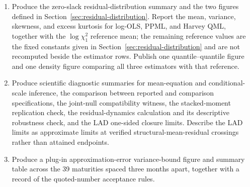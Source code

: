 \documentclass[11pt]{article}
\begin{document}
\begin{enumerate}
In addition to the baseline figures, render sweep figures of fitted conditional standard deviations
for PPML and Harvey QML\@. Solve the coefficient boxes for these figures over the
sorted union of the display slacks and the sweep slacks, running the same widening search
of Section~\ref{sec:idset} at every slack of that union, so a sweep slack off the display
grid receives a full endpoint solve rather than an interpolated box. Drop any sweep slack that is not
below the critical slack \(\tau^\star\) and render no figure for it; at least one sweep slack must
remain below \(\tau^\star\), and the reproduction stops otherwise. The sweep slacks are 0.05, 0.10, 0.20,
0.30, and 0.40. When at least two sweep slacks remain, also render combined level and
logarithmic-value figures and combined normalized lower- and upper-endpoint figures; with exactly one
remaining slack, produce the per-slack figures and none of the four combined panels. These fitted envelopes are attained numerical inner approximations,
not confidence bands or simultaneous path bands. Check that an available fitted path at the zero-slack point lies inside
every corresponding two-sided envelope.
\item Produce the zero-slack residual-distribution summary and the two figures
defined in Section~\ref{sec:residual-distribution}. Report the mean, variance,
skewness, and excess kurtosis for log-OLS, PPML, and Harvey QML, together with
the \(\log\chi_1^2\) reference mean; the remaining reference values are the fixed
constants given in Section~\ref{sec:residual-distribution} and are not
recomputed beside the estimator rows. Publish one quantile--quantile figure and one density
figure comparing all three estimators with that reference.
\item Produce scientific diagnostic summaries for mean-equation and conditional-scale inference,
the comparison between reported and comparison specifications, the joint-null compatibility witness,
the stacked-moment replication check, the residual-dynamics calculation and its descriptive
robustness check, and the LAD one-sided closure limits. Describe the LAD limits
as approximate limits at verified structural-mean-residual crossings rather than attained endpoints.
\item Produce a plug-in approximation-error variance-bound figure and summary table across the 39
maturities spaced three months apart, together with a record of the quoted-number acceptance rules.
\end{enumerate}
\end{document}
